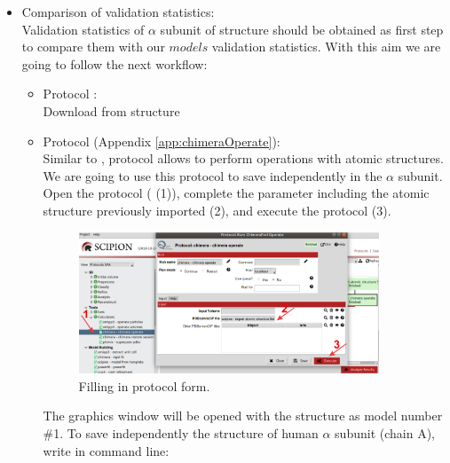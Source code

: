   \begin{itemize}
  \item Comparison of validation statistics: \\
  
  Validation statistics of  $\alpha$ subunit of  structure  should be obtained as first step to compare them with our $models$ validation statistics. With this aim we are going to follow the next workflow:\\
  \begin{itemize}
    \item Protocol :\\
    Download from  structure \\
    
    \item Protocol  (Appendix \ref{app:chimeraOperate}):\\
    Similar to \chimera {}, \chimera {} protocol allows to perform operations with atomic structures. We are going to use this protocol to save independently in \scipion the  $\alpha$ subunit. Open the protocol  ( (1)), complete the parameter  including the atomic structure  previously imported (2), and execute the protocol (3).      
    
    \begin{figure}[H]
    \centering 
    \captionsetup{width=.7\linewidth} 
    \includegraphics[width=0.90\textwidth]{Images/Fig36}
    \caption{Filling in \chimera {} protocol form.}
    \label{fig:chimera_operate_protocol}
    \end{figure}
    
    The \chimera graphics window will be opened with the structure  as model number \#1. To save independently the structure of human  $\alpha$ subunit (chain A), write in \chimera command line:\\
    \\
    \\
    

\end{itemize}
\end{itemize}
